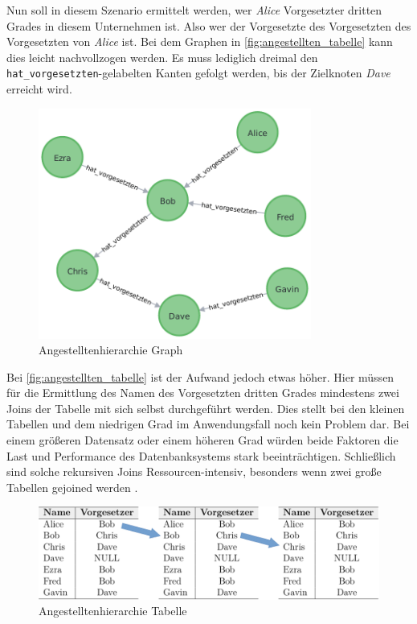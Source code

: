 Nun soll in diesem Szenario ermittelt werden, wer \textit{Alice} Vorgesetzter dritten Grades in diesem Unternehmen ist. Also wer der Vorgesetzte des Vorgesetzten des Vorgesetzten von \textit{Alice} ist. Bei dem Graphen in \autoref{fig:angestellten_tabelle} kann dies leicht nachvollzogen werden. Es muss lediglich dreimal den \texttt{hat\_vorgesetzten}-gelabelten Kanten gefolgt werden, bis der Zielknoten \textit{Dave} erreicht wird. 

\begin{figure}[ht]
    \centering
    \includegraphics[width=0.8\textwidth]{images/angestellten_graph.pdf}
    \caption{Angestelltenhierarchie Graph}
    \label{fig:angestellten_graph}
\end{figure}

Bei \autoref{fig:angestellten_tabelle} ist der Aufwand jedoch etwas höher. Hier müssen für die Ermittlung des Namen des Vorgesetzten dritten Grades mindestens zwei Joins der Tabelle mit sich selbst durchgeführt werden. Dies stellt bei den kleinen Tabellen und dem niedrigen Grad im Anwendungsfall noch kein Problem dar. Bei einem größeren Datensatz oder einem höheren Grad würden beide Faktoren die Last und Performance des Datenbanksystems stark beeinträchtigen. Schließlich sind solche rekursiven Joins Ressourcen-intensiv, besonders wenn zwei große Tabellen gejoined werden \cite{gdbms}. 

\begin{figure}[ht]
    \centering
    \includegraphics[width=\textwidth]{images/angestellte_tabellen.pdf}
    \caption{Angestelltenhierarchie Tabelle}
    \label{fig:angestellten_tabelle}
\end{figure}

